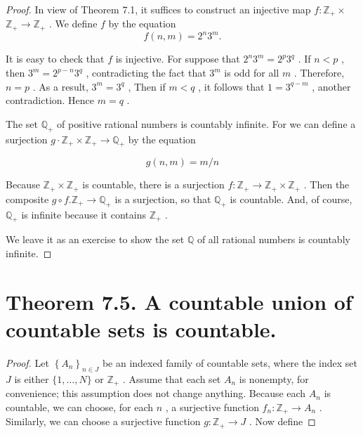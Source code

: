 \begin{theorem}
\begin{proof}In view of Theorem 7.1, it suffices to construct an injective map \(f : {\mathbb{Z}}_{ + } \times\)  \({\mathbb{Z}}_{ + } \rightarrow  {\mathbb{Z}}_{ + }\) . We define \(f\) by the equation
\[
f\left( {n,m}\right)  = {2}^{n}{3}^{m}.
\]

It is easy to check that \(f\) is injective. For suppose that \({2}^{n}{3}^{m} = {2}^{p}{3}^{q}\) . If \(n < p\) , then \({3}^{m} = {2}^{p - n}{3}^{q}\) , contradicting the fact that \({3}^{m}\) is odd for all \(m\) . Therefore, \(n = p\) . As a result, \({3}^{m} = {3}^{q}\) , Then if \(m < q\) , it follows that \(1 = {3}^{q - m}\) , another contradiction. Hence \(m = q\) .

\begin{centeredblock}
\begin{example} The set \({\mathbb{Q}}_{ + }\) of positive rational numbers is countably infinite. For we can define a surjection \(g \cdot  {\mathbb{Z}}_{ + } \times  {\mathbb{Z}}_{ + } \rightarrow  {\mathbb{Q}}_{ + }\) by the equation

\[
g\left( {n,m}\right)  = m/n
\]

Because \({\mathbb{Z}}_{ + } \times  {\mathbb{Z}}_{ + }\) is countable, there is a surjection \(f : {\mathbb{Z}}_{ + } \rightarrow  {\mathbb{Z}}_{ + } \times  {\mathbb{Z}}_{ + }\) . Then the composite \(g \circ  f.{\mathbb{Z}}_{ + } \rightarrow  {\mathbb{Q}}_{ + }\) is a surjection, so that \({\mathbb{Q}}_{ + }\) is countable. And, of course, \({\mathbb{Q}}_{ + }\) is infinite because it contains \({\mathbb{Z}}_{ + }\) .
\end{example}
\end{centeredblock}

We leave it as an exercise to show the set \(\mathbb{Q}\) of all rational numbers is countably infinite.
\end{proof}
\section*{Theorem 7.5. A countable union of countable sets is countable.}

\begin{proof}Let \({\left\{  {A}_{n}\right\}  }_{n \in  J}\) be an indexed family of countable sets, where the index set \(J\) is either \(\{ 1,\ldots ,N\}\) or \({\mathbb{Z}}_{ + }\) . Assume that each set \({A}_{n}\) is nonempty, for convenience; this assumption does not change anything.
Because each \({A}_{n}\) is countable, we can choose, for each \(n\) , a surjective function \({f}_{n} : {\mathbb{Z}}_{ + } \rightarrow  {A}_{n}\) . Similarly, we can choose a surjective function \(g : {\mathbb{Z}}_{ + } \rightarrow  J\) . Now define


\end{proof}
\end{theorem}
